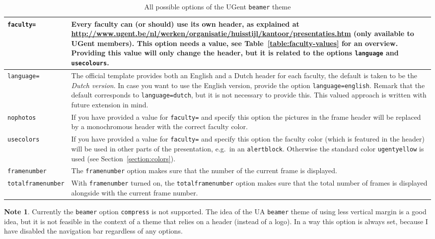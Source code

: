 \documentclass[a4paper,10pt]{article}
\theoremstyle{definition}
\newtheorem{note}{Note}
\begin{document}
\begin{table}
  \begin{tabulary}{12cm}{p{3cm}L}
    \toprule
    \texttt{faculty=} & Every faculty can (or should) use its own header, as explained at \url{http://www.ugent.be/nl/werken/organisatie/huisstijl/kantoor/presentaties.htm} (only available to UGent members). This option needs a value, see Table~\ref{table:faculty-values} for an overview. Providing this value will only change the header, but it is related to the options \texttt{language} and \texttt{usecolours}. \\\midrule
    \texttt{language=} & The official template provides both an English and a Dutch header for each faculty, the default is taken to be the \emph{Dutch version}. In case you want to use the English version, provide the option \texttt{language=english}. Remark that the default corresponds to \texttt{language=dutch}, but it is not necessary to provide this. This valued approach is written with future extension in mind. \\\midrule
    \texttt{nophotos} & If you have provided a value for \texttt{faculty=} and specify this option the pictures in the frame header will be replaced by a monochromous header with the correct faculty color. \\\midrule
    \texttt{usecolors} & If you have provided a value for \texttt{faculty=} and specify this option the faculty color (which is featured in the header) will be used in other parts of the presentation, e.g.\ in an \texttt{alertblock}. Otherwise the standard color \texttt{ugentyellow} is used (see Section~\ref{section:colors}). \\\midrule
    \texttt{framenumber} & The \texttt{framenumber} option makes sure that the number of the current frame is displayed. \\\midrule
    \texttt{totalframenumber} & With \texttt{framenumber} turned on, the \texttt{totalframenumber} option makes sure that the total number of frames is displayed alongside with the current frame number.\\\bottomrule
  \end{tabulary}
  \caption{All possible options of the UGent \texttt{beamer} theme}
  \label{table:options}
\end{table}

\begin{note}
  Currently the \texttt{beamer} option \verb|compress| is not supported. The idea of the UA \texttt{beamer} theme of using less vertical margin is a good idea, but it is not feasible in the context of a theme that relies on a header (instead of a logo). In a way this option is always set, because I have disabled the navigation bar regardless of any options.
\end{note}
\end{document}
